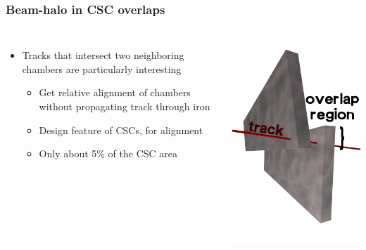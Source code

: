 \documentclass[compress]{beamer}
\begin{document}
\begin{frame}
\frametitle{Beam-halo in CSC overlaps}
\begin{columns}
\begin{itemize}
\item Tracks that intersect two neighboring chambers are particularly interesting
\begin{itemize}\setlength{\itemsep}{0.1 cm}
\item Get relative alignment of chambers without propagating track through iron
\item Design feature of CSCs, for alignment
\item Only about 5\% of the CSC area
\end{itemize}
\end{itemize}

\vspace{0.5 cm}
\includegraphics[width=\linewidth]{overlap.png}
\vspace{-0.5 cm}
\end{columns}


\end{frame}
\end{document}
